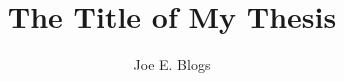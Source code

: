 \documentclass[12pt,a4paper]{report}
\title{The Title of My Thesis}
\author{Joe E. Blogs}
\begin{document}
% 

\beforeabstract





\afterabstract










\pagestyle{fancy}
\renewcommand{\chaptermark}[1]{\markboth{Chapter \thechapter: #1}{}}






\label{refs}



\appendix
\renewcommand{\chaptermark}[1]{\markboth{Appendix \thechapter: #1}{}}

\end{document}
